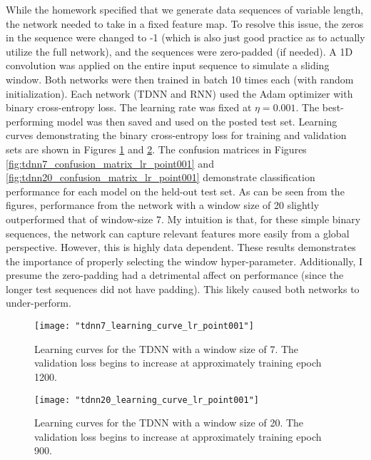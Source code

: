 \documentclass{article}[12 pt]
\begin{document}
\noindent
While the homework specified that we generate data sequences of variable length, the network needed to take in a fixed feature map.  To resolve this issue, the zeros in the sequence were changed to -1 (which is also just good practice as to actually utilize the full network), and the sequences were zero-padded (if needed).  A 1D convolution was applied on the entire input sequence to simulate a sliding window.  Both networks were then trained in batch 10 times each (with random initialization).  Each network (TDNN and RNN) used the Adam optimizer with binary cross-entropy loss.  The learning rate was fixed at $\eta=0.001$.  The best-performing model was then saved and used on the posted test set.  Learning curves demonstrating the binary cross-entropy loss for training and validation sets are shown in Figures \ref{fig:tdnn7_learning_curve_lr_point001} and \ref{fig:tdnn20_learning_curve_lr_point001}.  The confusion matrices in Figures \ref{fig:tdnn7_confusion_matrix_lr_point001} and \ref{fig:tdnn20_confusion_matrix_lr_point001} demonstrate classification performance for each model on the held-out test set.  As can be seen from the figures, performance from the network with a window size of 20 slightly outperformed that of window-size 7.  My intuition is that, for these simple binary sequences, the network can capture relevant features more easily from a global perspective.  However, this is highly data dependent.  These results demonstrates the importance of properly selecting the window hyper-parameter.  Additionally, I presume the zero-padding had a detrimental affect on performance (since the longer test sequences did not have padding).  This likely caused both networks to under-perform. 
   
\begin{center}
	\begin{figure}[H]
		\centering
		\texttt{[image: "tdnn7\_learning\_curve\_lr\_point001"]}
		\caption{Learning curves for the TDNN with a window size of 7.  The validation loss begins to increase at approximately training epoch 1200.}
		\label{fig:tdnn7_learning_curve_lr_point001}
	\end{figure}
\end{center}

\begin{center}
	\begin{figure}[H]
		\centering
		\texttt{[image: "tdnn20\_learning\_curve\_lr\_point001"]}
		\caption{Learning curves for the TDNN with a window size of 20.  The validation loss begins to increase at approximately training epoch 900.}
		\label{fig:tdnn20_learning_curve_lr_point001}
	\end{figure}
\end{center}
\end{document}
